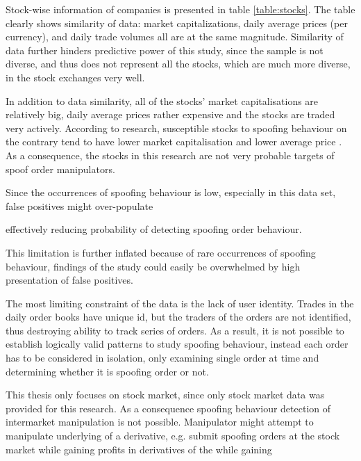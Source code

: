 \documentclass{tut-thesis}
\begin{document}
Stock-wise information of companies is presented in table \ref{table:stocks}. The table clearly shows similarity of data: market capitalizations, daily average prices (per currency), and daily trade volumes all are at the same magnitude. Similarity of data further hinders predictive power of this study, since the sample is not diverse, and thus does not represent all the stocks, which are much more diverse, in the stock exchanges very well.

In addition to data similarity, all of the stocks' market capitalisations are relatively big, daily average prices rather expensive and the stocks are traded very actively. According to research, susceptible stocks to spoofing behaviour on the contrary tend to have lower market capitalisation and lower average price \autocite{LeeEomPark2009, AggarwalWu2006, MeiWuZhou2004}. As a consequence, the stocks in this research are not very probable targets of spoof order manipulators. 

Since the occurrences of spoofing behaviour is low, especially in this data set, false positives might over-populate 

effectively reducing probability of detecting spoofing order behaviour.

This limitation is further inflated because of rare occurrences of spoofing behaviour, findings of the study could easily be overwhelmed by high presentation of false positives.

The most limiting constraint of the data is the lack of user identity. Trades in the daily order books have unique id, but the traders of the orders are not identified, thus destroying ability to track series of orders. As a result, it is not possible to establish logically valid patterns to study spoofing behaviour, instead each order has to be considered in isolation, only examining single order at time and determining whether it is spoofing order or not. 

This thesis only focuses on stock market, since only stock market data was provided for this research. As a consequence spoofing behaviour detection of intermarket manipulation is not possible. Manipulator might attempt to manipulate underlying of a derivative, e.g. submit spoofing orders at the stock market while gaining profits in derivatives of the  
while gaining 
\end{document}
